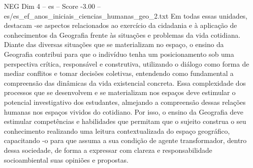 \begin{textsample}{NEG Dim 4 – es – Score -3.00 – es/es\_ef\_anos\_iniciais\_ciencias\_humanas\_geo\_2.txt}  \label{ex:f4_neg_216}
Em todas essas unidades, destacam -se aspectos relacionados ao exercício da cidadania e à aplicação de conhecimentos da Geografia frente às situações e problemas da vida cotidiana.
Diante das diversas situações que se materializam no espaço, o ensino da Geografia contribui para que o indivíduo tenha um posicionamento sob uma perspectiva crítica, responsável e construtiva, utilizando o diálogo como forma de mediar conflitos e tomar decisões coletivas, entendendo como fundamental a compreensão das dinâmicas da vida existencial concreta.
Essa complexidade dos processos que se desenvolvem e se materializam nos espaços deve estimular o potencial investigativo dos estudantes, almejando a compreensão dessas relações humanas nos espaços vividos do cotidiano.
Por isso, o ensino da Geografia deve estimular competências e habilidades que permitam que o sujeito construa o seu conhecimento realizando uma leitura contextualizada do espaço geográfico, capacitando -o para que assuma a sua condição de agente transformador, dentro dessa sociedade, de forma a expressar com clareza e responsabilidade socioambiental suas opiniões e propostas.

\end{textsample}

